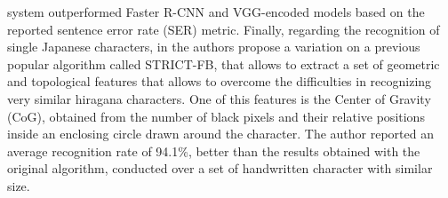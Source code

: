 system outperformed Faster R-CNN and VGG-encoded models based on the reported sentence error rate (SER) metric. Finally, regarding the recognition of single Japanese characters, in \cite{School_of_Engineering_Technology_West_Bengal_University_of_Technology_India2014-wb} the authors propose a variation on a previous popular algorithm called STRICT-FB, that allows to extract a set of geometric and topological features that allows to overcome the difficulties in recognizing very similar hiragana characters. One of this features is the Center of Gravity (CoG), obtained from the number of black pixels and their relative positions inside an enclosing circle drawn around the character. The author reported an average recognition rate of 94.1\%, better than the results obtained with the original algorithm, conducted over a set of handwritten character with similar size.